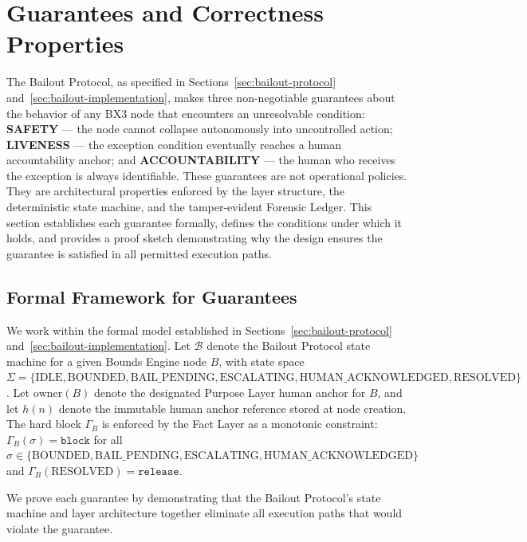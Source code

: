 \documentclass[12pt]{article}
\begin{document}
\section{Guarantees and Correctness Properties}
\label{sec:guarantees}

The Bailout Protocol, as specified in Sections~\ref{sec:bailout-protocol} and~\ref{sec:bailout-implementation}, makes three non-negotiable guarantees about the behavior of any BX3 node that encounters an unresolvable condition: \textbf{SAFETY} — the node cannot collapse autonomously into uncontrolled action; \textbf{LIVENESS} — the exception condition eventually reaches a human accountability anchor; and \textbf{ACCOUNTABILITY} — the human who receives the exception is always identifiable. These guarantees are not operational policies. They are architectural properties enforced by the layer structure, the deterministic state machine, and the tamper-evident Forensic Ledger. This section establishes each guarantee formally, defines the conditions under which it holds, and provides a proof sketch demonstrating why the design ensures the guarantee is satisfied in all permitted execution paths.

\subsection{Formal Framework for Guarantees}

We work within the formal model established in Sections~\ref{sec:bailout-protocol} and~\ref{sec:bailout-implementation}. Let $\mathcal{B}$ denote the Bailout Protocol state machine for a given Bounds Engine node $B$, with state space $\Sigma = \{\text{IDLE}, \text{BOUNDED}, \text{BAIL\_PENDING}, \text{ESCALATING}, \text{HUMAN\_ACKNOWLEDGED}, \text{RESOLVED}\}$. Let $\text{owner}(B)$ denote the designated Purpose Layer human anchor for $B$, and let $h(n)$ denote the immutable human anchor reference stored at node creation. The hard block $\Gamma_B$ is enforced by the Fact Layer as a monotonic constraint: $\Gamma_B(\sigma) = \texttt{block}$ for all $\sigma \in \{\text{BOUNDED}, \text{BAIL\_PENDING}, \text{ESCALATING}, \text{HUMAN\_ACKNOWLEDGED}\}$ and $\Gamma_B(\text{RESOLVED}) = \texttt{release}$.

We prove each guarantee by demonstrating that the Bailout Protocol's state machine and layer architecture together eliminate all execution paths that would violate the guarantee.

\end{document}
